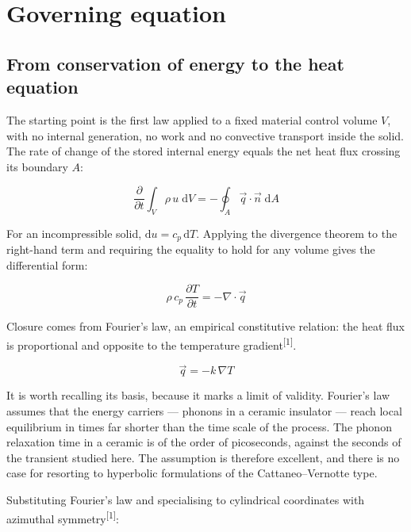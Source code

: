 \documentclass[11pt,a4paper]{article}
\newcommand{\cita}[1]{\textsuperscript{[\textcolor{uji}{#1}]}}
\begin{document}
\section{Governing equation}

\subsection{From conservation of energy to the heat equation}

The starting point is the first law applied to a fixed material control
volume $V$, with no internal generation, no work and no convective
transport inside the solid. The rate of change of the stored internal
energy equals the net heat flux crossing its boundary $A$:

\begin{equation}
\frac{\partial}{\partial t}\int_{V}\rho\, u\;\mathrm{d}V
= -\oint_{A}\vec{q}\cdot\vec{n}\;\mathrm{d}A
\end{equation}

For an incompressible solid, $\mathrm{d}u = c_p\,\mathrm{d}T$. Applying the
divergence theorem to the right-hand term and requiring the equality to
hold for any volume gives the differential form:

\begin{equation}
\rho\, c_p\, \frac{\partial T}{\partial t} = -\nabla\cdot\vec{q}
\end{equation}

Closure comes from Fourier's law, an empirical constitutive relation: the
heat flux is proportional and opposite to the temperature
gradient\cita{1}.

\begin{equation}
\vec{q} = -k\, \nabla T
\end{equation}

It is worth recalling its basis, because it marks a limit of validity.
Fourier's law assumes that the energy carriers --- phonons in a ceramic
insulator --- reach local equilibrium in times far shorter than the time
scale of the process. The phonon relaxation time in a ceramic is of the
order of picoseconds, against the seconds of the transient studied here.
The assumption is therefore excellent, and there is no case for resorting
to hyperbolic formulations of the Cattaneo--Vernotte type.

Substituting Fourier's law and specialising to cylindrical coordinates with
azimuthal symmetry\cita{1}:
\end{document}
